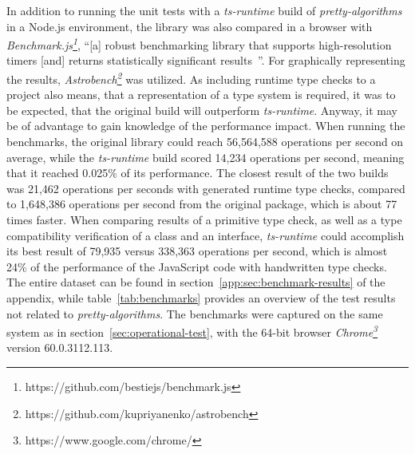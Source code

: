 In addition to running the unit tests with a \emph{ts-runtime} build of \emph{pretty-algorithms} in a Node.js environment, the library was also compared in a browser with \emph{Benchmark.js\footnote{https://github.com/bestiejs/benchmark.js}}, ``[a] robust benchmarking library that supports high-resolution timers [and] returns statistically significant results~\cite{Evaluation:benchmarkjs}''. For graphically representing the results, \emph{Astrobench\footnote{https://github.com/kupriyanenko/astrobench}} was utilized. As including runtime type checks to a project also means, that a representation of a type system is required, it was to be expected, that the original build will outperform \emph{ts-runtime}. Anyway, it may be of advantage to gain knowledge of the performance impact. When running the benchmarks, the original library could reach 56,564,588 operations per second on average, while the \emph{ts-runtime} build scored 14,234 operations per second, meaning that it reached 0.025\% of its performance. The closest result of the two builds was 21,462 operations per seconds with generated runtime type checks, compared to 1,648,386 operations per second from the original package, which is about 77 times faster. When comparing results of a primitive type check, as well as a type compatibility verification of a class and an interface, \emph{ts-runtime} could accomplish its best result of 79,935 versus 338,363 operations per second, which is almost 24\% of the performance of the JavaScript code with handwritten type checks. The entire dataset can be found in section~\ref{app:sec:benchmark-results} of the appendix, while table~\ref{tab:benchmarks} provides an overview of the test results not related to \emph{pretty-algorithms}. The benchmarks were captured on the same system as in section~\ref{sec:operational-test}, with the 64-bit browser \emph{Chrome\footnote{https://www.google.com/chrome/}} version 60.0.3112.113.
